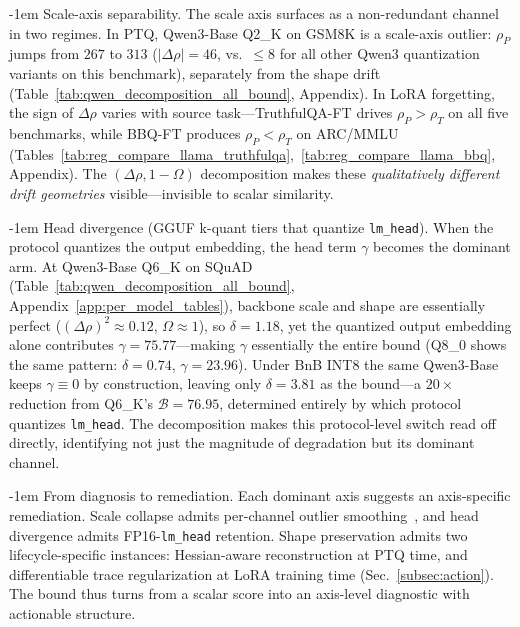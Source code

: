 \documentclass{article} %
\makeatletter
\newlength{\paraSpace}
\renewcommand{\paragraph}{\@startsection{paragraph}{4}{\z@}%
  {\paraSpace}{-1em}%
  {\normalfont\normalsize\bfseries}}
\makeatother
\begin{document}
\paragraph{Scale-axis separability.}
The scale axis surfaces as a non-redundant channel in two regimes. In PTQ, Qwen3-Base Q2\_K on GSM8K is a scale-axis outlier: $\rho_P$ jumps from $267$ to $313$ ($|\Delta\rho|{=}46$, vs.\ $\le 8$ for all other Qwen3 quantization variants on this benchmark), separately from the shape drift (Table~\ref{tab:qwen_decomposition_all_bound}, Appendix). In LoRA forgetting, the sign of $\Delta\rho$ varies with source task---TruthfulQA-FT drives $\rho_P > \rho_T$ on all five benchmarks, while BBQ-FT produces $\rho_P < \rho_T$ on ARC/MMLU (Tables~\ref{tab:reg_compare_llama_truthfulqa},~\ref{tab:reg_compare_llama_bbq}, Appendix). The $(\Delta\rho, 1{-}\Omega)$ decomposition makes these \emph{qualitatively different drift geometries} visible---invisible to scalar similarity.

\paragraph{Head divergence (GGUF k-quant tiers that quantize \texttt{lm\_head}).}
When the protocol quantizes the output embedding, the head term $\gamma$ becomes the dominant arm. At Qwen3-Base Q6\_K on SQuAD (Table~\ref{tab:qwen_decomposition_all_bound}, Appendix~\ref{app:per_model_tables}), backbone scale and shape are essentially perfect ($(\Delta\rho)^2{\approx}0.12$, $\Omega \approx 1$), so $\delta{=}1.18$, yet the quantized output embedding alone contributes $\gamma{=}75.77$---making $\gamma$ essentially the entire bound (Q8\_0 shows the same pattern: $\delta{=}0.74$, $\gamma{=}23.96$). Under BnB INT8 the same Qwen3-Base keeps $\gamma{\equiv}0$ by construction, leaving only $\delta{=}3.81$ as the bound---a $20\times$ reduction from Q6\_K's $\mathcal{B}{=}76.95$, determined entirely by which protocol quantizes \texttt{lm\_head}. The decomposition makes this protocol-level switch read off directly, identifying not just the magnitude of degradation but its dominant channel.

\paragraph{From diagnosis to remediation.}
Each dominant axis suggests an axis-specific remediation. Scale collapse admits per-channel outlier smoothing~\citep{xiao2023smoothquant}, and head divergence admits FP16-\texttt{lm\_head} retention. Shape preservation admits two lifecycle-specific instances: Hessian-aware reconstruction at PTQ time, and differentiable trace regularization at LoRA training time (Sec.~\ref{subsec:action}). The bound thus turns from a scalar score into an axis-level diagnostic with actionable structure.
\end{document}
